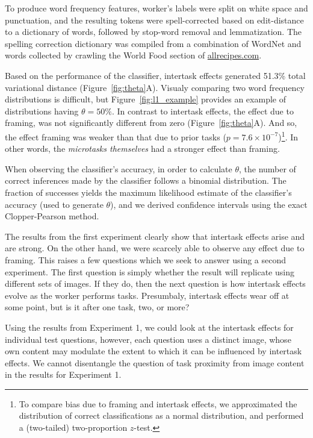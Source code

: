 \documentclass{sigchi}
\begin{document}
To produce word frequency features, worker's labels were split on white
space and punctuation, and the resulting tokens were spell-corrected based
on edit-distance to a dictionary of words, followed by stop-word removal
and lemmatization.  The spelling correction
dictionary was compiled from a combination of WordNet 
\cite{felbaum1998wordnet} and words
collected by crawling the World Food section of \url{allrecipes.com}.

Based on the performance of the classifier, intertask effects generated
51.3\% total variational distance (Figure~\ref{fig:theta}A).  
Visualy comparing two word frequency distributions is difficult, but 
Figure~\ref{fig:l1_example} provides an example of distributions having 
$\theta = 50\%$.  In contrast to intertask effects, the effect due to 
framing, was not significantly different from zero 
(Figure~\ref{fig:theta}A).
And so, the effect framing was weaker than that due to prior tasks 
($p=7.6\times 10^{-7}$)\footnote{To compare bias
  due to framing and intertask effects, we approximated the distribution
  of correct classifications as a normal distribution, and performed
a (two-tailed) two-proportion $z$-test.}.
In other words, the \textit{microtasks themselves}
had a stronger effect than framing.

When observing the classifier's accuracy, in order to calculate $\theta$,
the number of correct inferences made by the classifier follows a binomial 
distribution.  The fraction of successes yields the maximum likelihood
estimate of the classifier's accuracy (used to generate $\theta$), 
and we derived confidence intervals using the exact Clopper-Pearson method.

The results from the first experiment clearly show that intertask effects 
arise and are strong.  On the other hand, we were scarcely able to observe
any effect due to framing.  This raises a few questions which we seek
to answer using a second experiment.  The first question is simply whether
the result will replicate using different sets of images.  
If they do, then the next question is how intertask effects evolve
as the worker performs tasks.  Presumbaly, intertask effects wear off at 
some point, but is it after one task, two, or more?  

Using the results from Experiment 1, 
we could look at the intertask effects for individual test questions, 
however, each question uses a distinct image, whose own content may
modulate the extent to which it can be influenced by intertask effects.
We cannot disentangle the question of task proximity from image content
in the results for Experiment 1.
\end{document}
